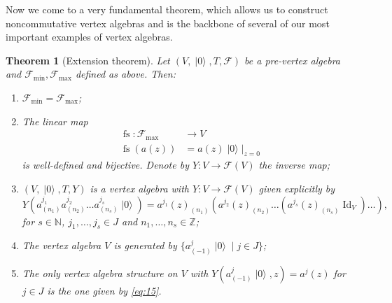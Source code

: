 \documentclass[a4paper, 12pt, reqno]{amsart}
\newtheorem{theorem}{Theorem}[subsection]
\theoremstyle{remark}
\numberwithin{equation}{subsection}
\DeclareMathOperator{\Id}{Id}
\DeclareMathOperator{\vac}{|0\rangle}
\DeclareMathOperator{\fs}{fs}
\begin{document}
Now we come to a very fundamental theorem, which allows us to construct noncommutative vertex algebras and is the backbone of several of our most important examples of vertex algebras.
\begin{theorem}[Extension theorem]
  \label{thr:14}
  Let $(V, \vac, T, \mathcal{F})$ be a pre-vertex algebra and $\mathcal{F}_{\min}, \mathcal{F}_{\max}$ defined as above.
  Then:
  \begin{enumerate}
  \item $\mathcal{F}_{\min} = \mathcal{F}_{\max}$;
  \item The linear map
    \begin{align*}
      \fs: \mathcal{F}_{\max} &\to V \\
      \fs(a(z)) &= a(z)\vac|_{z = 0}
    \end{align*}
    is well-defined and bijective.
    Denote by $Y: V \to \mathcal{F}(V)$ the inverse map;
  \item $(V, \vac, T, Y)$ is a vertex algebra with $Y: V \to \mathcal{F}(V)$ given explicitly by
    \begin{equation}
      \label{eq:15}
      Y(a^{j_1}_{(n_1)}a^{j_2}_{(n_2)}\dots a^{j_s}_{(n_s)}\vac) = a^{j_1}(z)_{(n_1)}(a^{j_2}(z)_{(n_2)}\dots (a^{j_s}(z)_{(n_s)}\Id_V)\dots),
    \end{equation}
    for $s \in \mathbb{N}$, $j_1, \dots, j_s \in J$ and $n_1, \dots, n_s \in \mathbb{Z}$;
  \item The vertex algebra $V$ is generated by $\{a^j_{(-1)}\vac \mid j \in J\}$;
  \item The only vertex algebra structure on $V$ with $Y(a^j_{(-1)}\vac, z) = a^j(z)$ for $j \in J$ is the one given by \eqref{eq:15}.
  \end{enumerate}
\end{theorem}
\end{document}
